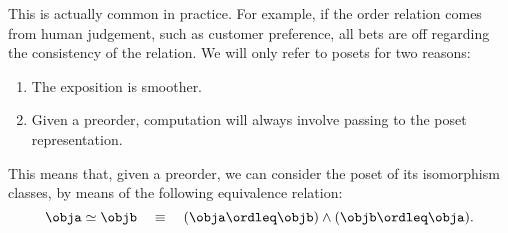 \begin{comment}
\begin{figure}[tbh]
    \begin{center}
        \includesag{80_preorder}
    \end{center}
    \todo{Let's not use Hasse for preorders, it's not a thing.}
    \caption{Example of a preorder. }
    \label{fig:preorder}
\end{figure}
\end{comment}

This is actually common in practice. For example, if the order relation comes from human judgement, such as customer preference, all bets are off regarding the consistency of the relation. We will only refer to posets for two reasons:
\begin{enumerate}
    \item The exposition is smoother.
    \item Given a preorder, computation will always involve passing to the poset representation.
\end{enumerate}
This means that, given a preorder, we can consider the poset of its isomorphism classes, by means of the following equivalence relation:
\begin{equation}
    \obja \simeq \objb \quad \equiv \quad (\obja \ordleq \objb) \wedge (\objb \ordleq \obja).
\end{equation}

